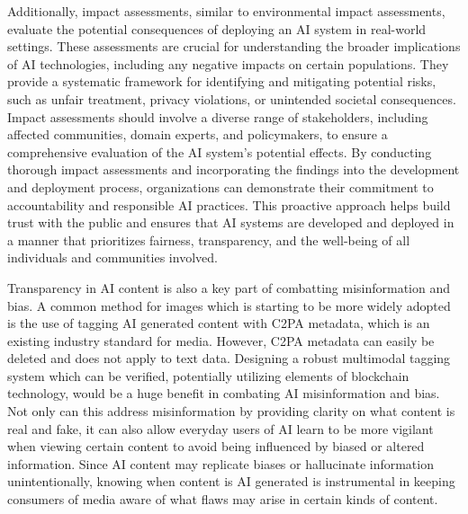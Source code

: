\documentclass[10pt]{article}
\begin{document}
    Additionally, impact assessments, similar to environmental impact assessments, evaluate the potential consequences of deploying an AI system in real-world settings. These assessments are crucial for understanding the broader implications of AI technologies, including any negative impacts on certain populations. They provide a systematic framework for identifying and mitigating potential risks, such as unfair treatment, privacy violations, or unintended societal consequences. Impact assessments should involve a diverse range of stakeholders, including affected communities, domain experts, and policymakers, to ensure a comprehensive evaluation of the AI system's potential effects. By conducting thorough impact assessments and incorporating the findings into the development and deployment process, organizations can demonstrate their commitment to accountability and responsible AI practices. This proactive approach helps build trust with the public and ensures that AI systems are developed and deployed in a manner that prioritizes fairness, transparency, and the well-being of all individuals and communities involved.

    Transparency in AI content is also a key part of combatting misinformation and bias. A common method for images which is starting to be more widely adopted is the use of tagging AI generated content with C2PA metadata, which is an existing industry standard for media. However, C2PA metadata can easily be deleted and does not apply to text data. Designing a robust multimodal tagging system which can be verified, potentially utilizing elements of blockchain technology, would be a huge benefit in combating AI misinformation and bias. Not only can this address misinformation by providing clarity on what content is real and fake, it can also allow everyday users of AI learn to be more vigilant when viewing certain content to avoid being influenced by biased or altered information. Since AI content may replicate biases or hallucinate information unintentionally, knowing when content is AI generated is instrumental in keeping consumers of media aware of what flaws may arise in certain kinds of content.
\end{document}
